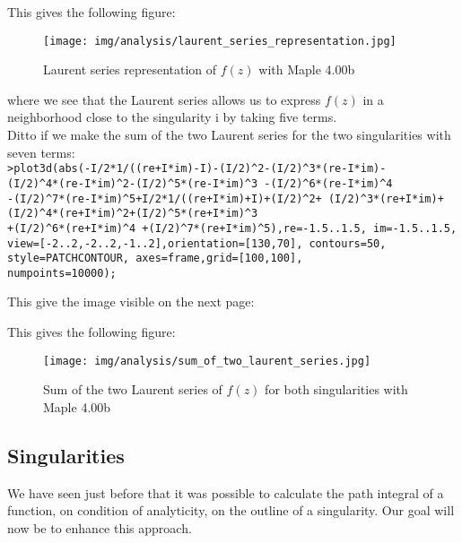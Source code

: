 	\pagebreak
	\begin{tcolorbox}[colframe=black,colback=white,sharp corners]
	This gives the following figure:
	\begin{figure}[H]
		\centering
		\texttt{[image: img/analysis/laurent\_series\_representation.jpg]}
		\caption{Laurent series representation of $f(z)$ with Maple 4.00b}
	\end{figure}
	where we see that the Laurent series allows us to express $f (z)$ in a neighborhood close to the singularity $\mathrm{i}$ by taking five terms.\\
	
	Ditto if we make the sum of the two Laurent series for the two singularities with seven terms:\\
	
	\texttt{>plot3d(abs(-I/2*1/((re+I*im)-I)-(I/2)\string^2-(I/2)\string^3*(re-I*im)-\\
	(I/2)\string^4*(re-I*im)\string^2-(I/2)\string^5*(re-I*im)\string^3 -(I/2)\string^6*(re-I*im)\string^4\\
	-(I/2)\string^7*(re-I*im)\string^5+I/2*1/((re+I*im)+I)+(I/2)\string^2+
(I/2)\string^3*(re+I*im)+(I/2)\string^4*(re+I*im)\string^2+(I/2)\string^5*(re+I*im)\string^3\\
	+(I/2)\string^6*(re+I*im)\string^4
+(I/2)\string^7*(re+I*im)\string^5),re=-1.5..1.5, im=-1.5..1.5, view=[-2..2,-2..2,-1..2],orientation=[130,70], contours=50, style=PATCHCONTOUR, axes=frame,grid=[100,100],\\
numpoints=10000);}

	This give the image visible on the next page:
	\end{tcolorbox}
	
	\pagebreak
	\begin{tcolorbox}[colframe=black,colback=white,sharp corners]
	This gives the following figure:
	\begin{figure}[H]
		\centering
		\texttt{[image: img/analysis/sum\_of\_two\_laurent\_series.jpg]}
		\caption{Sum of the two Laurent series of $f(z)$ for both singularities with Maple 4.00b}
	\end{figure}
	\end{tcolorbox}
	
	\subsection{Singularities}
	We have seen just before that it was possible to calculate the path integral of a function, on condition of analyticity, on the outline of a singularity. Our goal will now be to enhance this approach.
	
